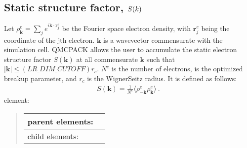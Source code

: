 \documentclass[letterpaper,10pt,english]{sphinxmanual}
\begin{document}
\def\sphinxLiteralBlockLabel{\label{\detokenize{hamiltonianobservable:listing-28}}}
\begin{sphinxVerbatim}[commandchars=\\\{\}]
      
\end{sphinxVerbatim}


\subsection{Static structure factor, \protect\(S(k)\protect\)}
\label{\detokenize{hamiltonianobservable:static-structure-factor-s-k}}
Let
\(\rho^e_{\mathbf{k}}=\sum_j e^{i \mathbf{k}\cdot\mathbf{r}_j^e}\)
be the Fourier space electron density, with \(\mathbf{r}^e_j\) being
the coordinate of the j\sphinxhyphen{}th electron. \(\mathbf{k}\) is a wavevector
commensurate with the simulation cell. QMCPACK allows the user to
accumulate the static electron structure factor \(S(\mathbf{k})\) at
all commensurate \(\mathbf{k}\) such that
\(|\mathbf{k}| \leq (LR\_DIM\_CUTOFF) r_c\). \(N^e\) is the
number of electrons,  is the optimized breakup
parameter, and \(r_c\) is the Wigner\sphinxhyphen{}Seitz radius. It is defined as
follows:
\begin{equation}\label{equation:hamiltonianobservable:eq36}
\begin{split}S(\mathbf{k}) = \frac{1}{N^e}\langle \rho^e_{-\mathbf{k}} \rho^e_{\mathbf{k}} \rangle\:.\end{split}
\end{equation}
 element:
\begin{quote}


\begin{savenotes}\sphinxattablestart
\centering
\begin{tabulary}{\linewidth}[t]{|T|T|}
\hline

parent elements:
&
\\
\hline
child elements:
&
\\
\hline
\end{tabulary}
\par
\sphinxattableend\end{savenotes}
\end{quote}
\end{document}
